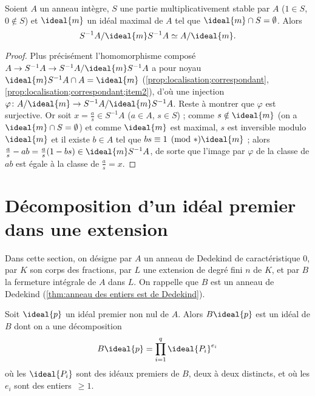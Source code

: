 \documentclass[11pt, %
  title in boldface,
  theorem in new line,
  theorem numbering = section,
  number theorems separately,
  simple name,
]{beaulivre}
\begin{document}
    \begin{proposition}\label{prop:quotient et localisation}
        Soient \( A \) un anneau intègre, \( S \) une partie multiplicativement stable par \( A \) (\( 1 \in S \), \( 0 \notin S \)) et \( \ideal{m} \) un idéal maximal de \( A \) tel que \( \ideal{m} \cap S = \emptyset \). Alors
        \[
            S^{-1} A / \ideal{m} S^{-1} A \simeq A/\ideal{m}.
        \]
    \end{proposition}
    \begin{proof}
        Plus précisément l'homomorphisme composé \( A \to S^{-1} A \to S^{-1} A / \ideal{m} S^{-1} A \) a pour noyau \( \ideal{m} S^{-1} A \cap A = \ideal{m} \) (\cref{prop:localisation;correspondant}, \ref{prop:localisation;correspondant;item2}), d'où une injection \( \varphi \colon A/\ideal{m} \to S^{-1} A / \ideal{m} S^{-1} A \). Reste à montrer que \( \varphi \) est surjective. Or soit \( x = \frac{a}{s} \in S^{-1} A \) (\( a \in A \), \( s \in S \)) ; comme \( s \notin \ideal{m} \) (on a \( \ideal{m} \cap S = \emptyset \)) et comme \( \ideal{m} \) est maximal, \( s \) est inversible modulo \( \ideal{m} \) et il existe \( b \in A \) tel que \( bs \equiv 1 \pmod*{\ideal{m}} \) ; alors \( \frac{a}{s} - ab = \frac{a}{s} (1-bs) \in \ideal{m} S^{-1} A \), de sorte que l'image par \( \varphi \) de la classe de \( ab \) est égale à la classe de \( \frac{a}{s} = x \).
    \end{proof}

\section{Décomposition d'un idéal premier dans une extension}\label{sec:décomposition d'un idéal premier dans une extension}

    Dans cette section, on désigne par \( A \) un anneau de Dedekind de caractéristique \( 0 \), par \( K \) son corps des fractions, par \( L \) une extension de degré fini \( n \) de \( K \), et par \( B \) la fermeture intégrale de \( A \) dans \( L \). On rappelle que \( B \) est un anneau de Dedekind (\cref{thm:anneau des entiers est de Dedekind}).

    \medskip
    Soit \( \ideal{p} \) un idéal premier non nul de \( A \). Alors \( B \ideal{p} \) est un idéal de \( B \) dont on a une décomposition
    \begin{equation}\label{eq:décomposition d'idéal dans une extension}
        B \ideal{p} = \prod_{i=1}^q \ideal{P_i}^{e_i}
    \end{equation}
    où les \( \ideal{P_i} \) sont des idéaux premiers de \( B \), deux à deux distincts, et où les \( e_i \) sont des entiers~\( \geqslant 1 \).
\end{document}
